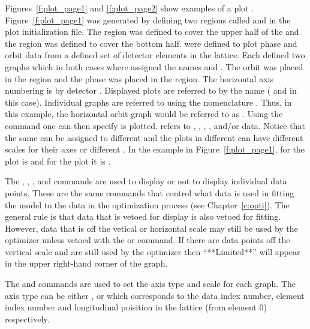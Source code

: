Figures~\ref{f:plot_page1} and \ref{f:plot_page2} show examples of a
plot . Figure~\ref{f:plot_page1} was generated by defining
two regions called  and  in the plot initialization
file. The  region was defined to cover the upper half of the
 and the  region was defined to cover the bottom
half.  were defined to plot phase and orbit data
from a defined set of detector elements in the lattice. Each
 defined two graphs which in both cases where
assigned the names  and . The orbit  was
placed in the  region and the phase  was
placed in the  region. The horizontal axis numbering is by
detector .  Displayed plots are referred to by the
 name ( and  in this case). Individual
graphs are referred to using the nomenclature
. Thus, in this example, the horizontal orbit graph
would be referred to as .  Using the  command one
can then specify  is plotted.  refers to
, , , , and/or
 data.  Notice that the same  can be
assigned to different  and the plots in different
 can have different scales for their axes or different
. In the example in Figure~\ref{f:plot_page1},  for the
 plot is  and for the  plot it is
.

The , , , and  commands are used
to display or not to display individual data points. These are the
same commands that control what data is used in fitting the model to
the data in the optimization process (see Chapter~\ref{c:opti}). The
general rule is that data that is vetoed for display is also vetoed
for fitting. However, data that is off the vetical or horizontal scale may still
be used by the optimizer unless vetoed with the  or  command.
If there are data points off the vertical scale and are still used by the
optimizer then ``**Limited**'' will appear in the upper right-hand corner of the
graph.

The  and  commands are used to set the axis type and
scale for each graph. The axis type can be either ,  
or  which
corresponds to the data index number, element index number and longitudinal 
poisition in the lattice
(from element 0) respectively.

